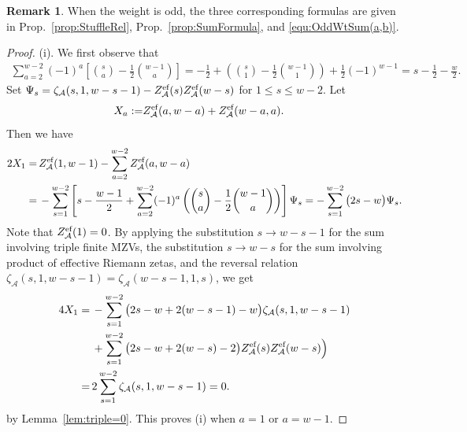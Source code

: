 \documentclass{article}
\newcommand{\calA}{\mathcal{A}}
\newcommand{\eff}{\text{\rm{ef}}}
\theoremstyle{plain}
\theoremstyle{definition}
\newtheorem{rem}[thm]{Remark}
\begin{document}
\begin{rem}
When the weight is odd, the three corresponding formulas are given in Prop.~\ref{prop:StuffleRel}, Prop.~\ref{prop:SumFormula}, and \eqref{equ:OddWtSum(a,b)}.
\end{rem}

\begin{proof}
(i). We first observe that
\begin{align}\label{equ:CoefSumId}
\sum_{a=2}^{w-2}(-1)^a
\left[\binom{s}{a}-\frac12\binom{w-1}{a}\right]
=-\frac 12+\left(\binom{s}{1}-\frac12\binom{w-1}{1}\right)+\frac 12(-1)^{w-1}=s-\frac 12-\frac w2.
\end{align}
Set $\Psi_s =\zeta_\calA(s,1,w-s-1)-Z_\calA^\eff(s)Z_\calA^\eff(w-s)$ for $1\le s\le w-2$. Let
\begin{align*}
X_a:=&  Z_\calA^\eff(a,w-a)+ Z_\calA^\eff(w-a,a).
\end{align*}
Then we have
\begin{align*}
2X_1=&\, Z_\calA^\eff(1,w-1)-\sum_{a=2}^{w-2}Z_\calA^\eff(a,w-a) \\
 =&\,-\sum_{s=1}^{w-2} \left[ s-\frac{w-1}2 +\sum_{a=2}^{w-2} (-1)^a \left( \binom{s}{a}-\frac12\binom{w-1}{a}\right)\right] \Psi_s
 =-\sum_{s=1}^{w-2} \big(2s-w\big) \Psi_s.
\end{align*}
Note that $Z_\calA^\eff(1)=0$. By applying the substitution $s\to w-s-1$ for the sum involving triple finite MZVs,
the substitution $s\to w-s$ for the sum involving product of effective Riemann zetas,
and the reversal relation $\zeta_\calA(s,1,w-s-1)=\zeta_\calA(w-s-1,1,s)$, we get
\begin{align*}
4X_1 =&\, -\sum_{s=1}^{w-2} \big(2s-w+2(w-s-1)-w\big)\zeta_\calA(s,1,w-s-1) \\
&\, +\sum_{s=1}^{w-2} \big(2s-w+2(w-s)-2\big) Z_\calA^\eff(s)Z_\calA^\eff(w-s)\Big) \\
=&\, 2\sum_{s=1}^{w-2} \zeta_\calA(s,1,w-s-1)=0.
\end{align*}
by Lemma~\ref{lem:triple=0}. This proves (i) when $a=1$ or $a=w-1$.


\end{proof}
\end{document}
